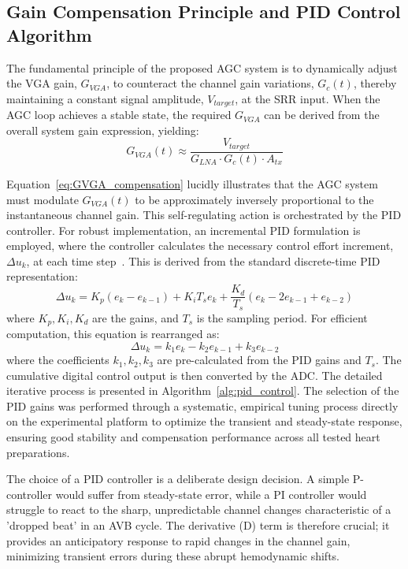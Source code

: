 \documentclass[journal]{IEEEtran}
\begin{document}
\subsection{Gain Compensation Principle and PID Control Algorithm}
\label{subsec:principle_and_algorithm}
The fundamental principle of the proposed AGC system is to dynamically adjust the VGA gain, $G_{VGA}$, to counteract the channel gain variations, $G_c(t)$, thereby maintaining a constant signal amplitude, $V_{target}$, at the SRR input. When the AGC loop achieves a stable state, the required $G_{VGA}$ can be derived from the overall system gain expression, yielding:
\begin{equation}
    G_{VGA}(t) \approx \frac{V_{target}}{G_{LNA} \cdot G_c(t) \cdot A_{tx}}
    \label{eq:GVGA_compensation}
\end{equation}

Equation~\eqref{eq:GVGA_compensation} lucidly illustrates that the AGC system must modulate $G_{VGA}(t)$ to be approximately inversely proportional to the instantaneous channel gain. This self-regulating action is orchestrated by the PID controller. For robust implementation, an incremental PID formulation is employed, where the controller calculates the necessary control effort increment, $\Delta u_k$, at each time step~\cite{wang2022incremental}. This is derived from the standard discrete-time PID representation:
\begin{equation}
    \Delta u_k = K_p (e_k - e_{k-1}) + K_i T_s e_k + \frac{K_d}{T_s} (e_k - 2e_{k-1} + e_{k-2})
    \label{eq:PID_standard_discrete}
\end{equation}
where $K_p, K_i, K_d$ are the gains, and $T_s$ is the sampling period. For efficient computation, this equation is rearranged as:
\begin{equation}
    \Delta u_k = k_1 e_k - k_2 e_{k-1} + k_3 e_{k-2}
    \label{eq:PID_computational_form}
\end{equation}
where the coefficients $k_1, k_2, k_3$ are pre-calculated from the PID gains and $T_s$. The cumulative digital control output is then converted by the ADC. The detailed iterative process is presented in Algorithm~\ref{alg:pid_control}. The selection of the PID gains was performed through a systematic, empirical tuning process directly on the experimental platform to optimize the transient and steady-state response, ensuring good stability and compensation performance across all tested heart preparations.

The choice of a PID controller is a deliberate design decision. A simple P-controller would suffer from steady-state error, while a PI controller would struggle to react to the sharp, unpredictable channel changes characteristic of a 'dropped beat' in an AVB cycle. The derivative (D) term is therefore crucial; it provides an anticipatory response to rapid changes in the channel gain, minimizing transient errors during these abrupt hemodynamic shifts.
\end{document}
